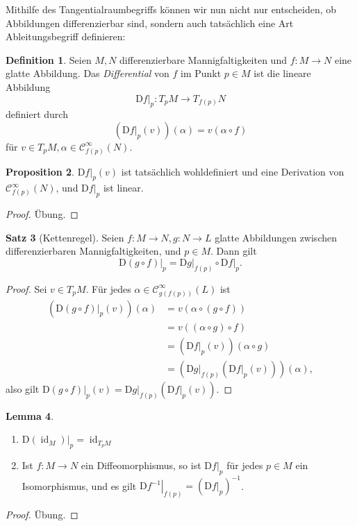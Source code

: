\documentclass[a4paper]{scrreprt}
\numberwithin{equation}{chapter}
\newcommand{\DD}{\mathrm{D}}
\DeclareMathOperator{\id}{id}
\newcommand{\sC}{\mathcal{C}^{\infty}}
\theoremstyle{definition}
\newtheorem{defn}{Definition}[section]
\newtheorem{lemma}[defn]{Lemma}
\newtheorem{prop}[defn]{Proposition}
\newtheorem{satz}[defn]{Satz}
\newcommand{\bewUeb}{\begin{proof}Übung.\end{proof}}
\begin{document}
Mithilfe des Tangentialraumbegriffs können wir nun nicht nur entscheiden, ob Abbildungen differenzierbar sind, sondern auch tatsächlich eine Art Ableitungsbegriff definieren:
\begin{defn}
	Seien $M,N$ differenzierbare Mannigfaltigkeiten und $f\colon M \to N$ eine glatte Abbildung. Das \emph{Differential} von $f$ im Punkt $p\in M$ ist die lineare Abbildung
	\[\left.\DD f\right|_p \colon T_pM \to T_{f(p)}N\]
	definiert durch
	\[\left(\left.\DD f\right|_p(v)\right)(\alpha) = v (\alpha\circ f)\]
	für $v\in T_pM, \alpha \in \sC_{f(p)}(N)$.
\end{defn}
\begin{prop}
	$\left.\DD f\right|_p(v)$ ist tatsächlich wohldefiniert und eine Derivation von $\sC_{f(p)}(N)$, und $\left.\DD f\right|_p$ ist linear. \bewUeb
\end{prop}

\begin{satz}[Kettenregel]
	Seien $f\colon M \to N, g\colon N \to L$ glatte Abbildungen zwischen differenzierbaren Mannigfaltigkeiten, und $p \in M$. Dann gilt \[\left.\DD(g\circ f)\right|_p = \left.\DD g\right|_{f(p)} \circ \left.\DD f\right|_p.\]

	\begin{proof}
		Sei $v \in T_pM$. Für jedes $\alpha \in \sC_{g(f(p))}(L)$ ist
		\begin{align*}
			\left(\left.\DD(g\circ f)\right|_p(v)\right)(\alpha) &= v(\alpha\circ (g \circ f))\\
			&= v((\alpha\circ g) \circ f)\\
			&= \left(\left.\DD f\right|_p(v)\right) (\alpha \circ g)\\
			&= \left(\left.\DD g\right|_{f(p)} \left(\left.\DD f\right|_p(v)\right)\right) (\alpha),
		\end{align*}
		also gilt $\left.\DD(g\circ f)\right|_p(v) = \left.\DD g\right|_{f(p)}\left(\left.\DD f\right|_p(v)\right)$.
	\end{proof}
\end{satz}

\begin{lemma} \label{lemma:differential_diffeo}
	\begin{enumerate}[label=(\alph*)]
		\item $\left.\DD(\id_M)\right|_p = \id_{T_pM}$
		\item Ist $f\colon M \to N$ ein Diffeomorphismus, so ist $\left.\DD f\right|_p$ für jedes $p\in M$ ein Isomorphismus, und es gilt $\left.\DD f^{-1}\right|_{f(p)} = \left(\left.\DD f\right|_p\right)^{-1}$.
	\end{enumerate}
	\bewUeb
\end{lemma}
\end{document}
